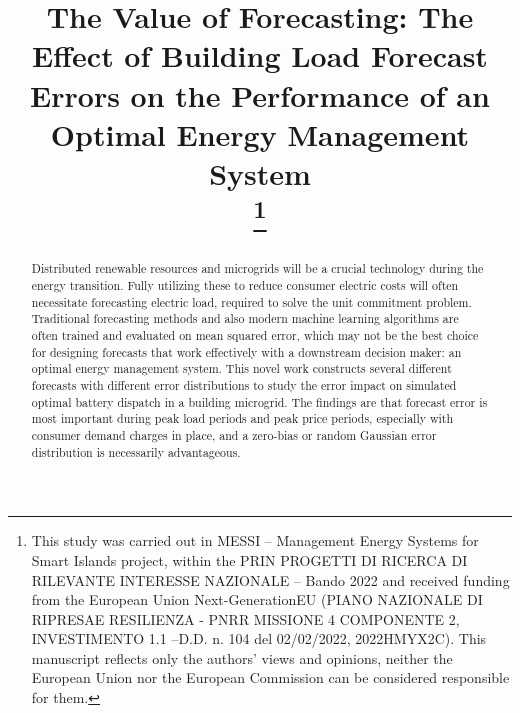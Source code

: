 \documentclass[conference]{IEEEtran}
\begin{document}
\title{The Value of Forecasting: The Effect of Building Load Forecast Errors on the Performance of an Optimal Energy Management System \\
\thanks{This study was carried out in MESSI – Management Energy Systems for Smart Islands project, within the PRIN PROGETTI DI RICERCA DI RILEVANTE INTERESSE NAZIONALE – Bando 2022 and received funding from the European Union Next-GenerationEU (PIANO NAZIONALE DI RIPRESAE RESILIENZA - PNRR MISSIONE 4 COMPONENTE 2, INVESTIMENTO 1.1 –D.D. n. 104 del 02/02/2022, 2022HMYX2C). This manuscript reflects only the authors’ views and opinions, neither the European Union nor the European Commission can be considered responsible for them.}}

\author{
\and
{}
\and
{}
}

\maketitle

\begin{abstract}
    Distributed renewable resources and microgrids will be a crucial technology during the energy transition. Fully utilizing these to reduce consumer electric costs will often necessitate forecasting electric load, required to solve the unit commitment problem. Traditional forecasting methods and also modern machine learning algorithms are often trained and evaluated on mean squared error, which may not be the best choice for designing forecasts that work effectively with a downstream decision maker: an optimal energy management system. This novel work constructs several different forecasts with different error distributions to study the error impact on simulated optimal battery dispatch in a building microgrid. The findings are that forecast error is most important during peak load periods and peak price periods, especially with consumer demand charges in place, and a zero-bias or random Gaussian error distribution is necessarily advantageous. 
    \end{abstract}
\end{document}

